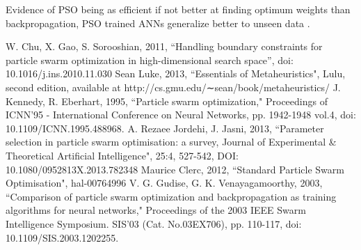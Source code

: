 \documentclass[12pt]{article}
\begin{document}
Evidence of PSO being as efficient if not better at finding optimum weights than backpropagation, PSO trained ANNs generalize better to unseen data \cite{Kennedy}.


\vspace{-1.5em}
\begin{thebibliography}{10}

 W. Chu, X. Gao, S. Sorooshian, 2011, ``Handling boundary constraints for particle swarm optimization in high-dimensional search space'', doi: 10.1016/j.ins.2010.11.030
 Sean Luke, 2013, ``Essentials of Metaheuristics", Lulu, second edition, available at http://cs.gmu.edu/∼sean/book/metaheuristics/
 J. Kennedy, R. Eberhart, 1995, ``Particle swarm optimization," Proceedings of ICNN'95 - International Conference on Neural Networks,  pp. 1942-1948 vol.4, doi: 10.1109/ICNN.1995.488968.
 A. Rezaee Jordehi, J. Jasni, 2013, ``Parameter selection in particle swarm optimisation: a survey, Journal of Experimental \& Theoretical Artificial Intelligence", 25:4, 527-542, DOI: 10.1080/0952813X.2013.782348
 Maurice Clerc, 2012, ``Standard Particle Swarm Optimisation", hal-00764996
  V. G. Gudise, G. K. Venayagamoorthy, 2003, ``Comparison of particle swarm optimization and backpropagation as training algorithms for neural networks," Proceedings of the 2003 IEEE Swarm Intelligence Symposium. SIS'03 (Cat. No.03EX706), pp. 110-117, doi: 10.1109/SIS.2003.1202255.


\end{thebibliography}
\end{document}
